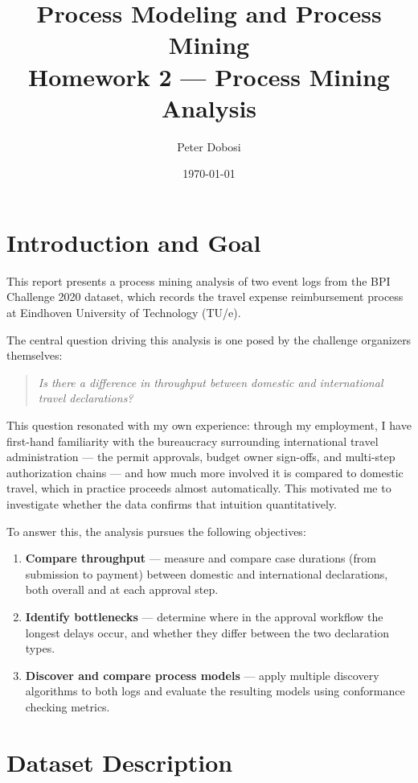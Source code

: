\documentclass[11pt,a4paper]{article}
\title{Process Modeling and Process Mining\\Homework 2 — Process Mining Analysis}
\author{Peter Dobosi}
\date{\today}
\begin{document}
\maketitle

\section{Introduction and Goal}

This report presents a process mining analysis of two event logs from the BPI Challenge 2020 dataset, which records the travel expense reimbursement process at Eindhoven University of Technology (TU/e).

The central question driving this analysis is one posed by the challenge organizers themselves:

\begin{quote}
\textit{Is there a difference in throughput between domestic and international travel declarations?}
\end{quote}

This question resonated with my own experience: through my employment, I have first-hand familiarity with the bureaucracy surrounding international travel administration — the permit approvals, budget owner sign-offs, and multi-step authorization chains — and how much more involved it is compared to domestic travel, which in practice proceeds almost automatically. This motivated me to investigate whether the data confirms that intuition quantitatively.

To answer this, the analysis pursues the following objectives:
\begin{enumerate}[leftmargin=*]
    \item \textbf{Compare throughput} — measure and compare case durations (from submission to payment) between domestic and international declarations, both overall and at each approval step.
    \item \textbf{Identify bottlenecks} — determine where in the approval workflow the longest delays occur, and whether they differ between the two declaration types.
    \item \textbf{Discover and compare process models} — apply multiple discovery algorithms to both logs and evaluate the resulting models using conformance checking metrics.
\end{enumerate}

\section{Dataset Description}
\end{document}
